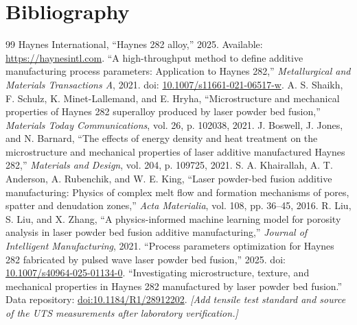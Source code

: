 \documentclass[12pt,a4paper,oneside]{report}
\begin{document}
\chapter{Bibliography}
\begin{thebibliography}{99}
 Haynes International, ``Haynes 282 alloy,'' 2025. Available: \url{https://haynesintl.com}.
 ``A high-throughput method to define additive manufacturing process parameters: Application to Haynes 282,'' \emph{Metallurgical and Materials Transactions A}, 2021. doi: \href{https://doi.org/10.1007/s11661-021-06517-w}{10.1007/s11661-021-06517-w}.
 A. S. Shaikh, F. Schulz, K. Minet-Lallemand, and E. Hryha, ``Microstructure and mechanical properties of Haynes 282 superalloy produced by laser powder bed fusion,'' \emph{Materials Today Communications}, vol. 26, p. 102038, 2021.
 J. Boswell, J. Jones, and N. Barnard, ``The effects of energy density and heat treatment on the microstructure and mechanical properties of laser additive manufactured Haynes 282,'' \emph{Materials and Design}, vol. 204, p. 109725, 2021.
 S. A. Khairallah, A. T. Anderson, A. Rubenchik, and W. E. King, ``Laser powder-bed fusion additive manufacturing: Physics of complex melt flow and formation mechanisms of pores, spatter and denudation zones,'' \emph{Acta Materialia}, vol. 108, pp. 36--45, 2016.
 R. Liu, S. Liu, and X. Zhang, ``A physics-informed machine learning model for porosity analysis in laser powder bed fusion additive manufacturing,'' \emph{Journal of Intelligent Manufacturing}, 2021.
 ``Process parameters optimization for Haynes 282 fabricated by pulsed wave laser powder bed fusion,'' 2025. doi: \href{https://doi.org/10.1007/s40964-025-01134-0}{10.1007/s40964-025-01134-0}.
 ``Investigating microstructure, texture, and mechanical properties in Haynes 282 manufactured by laser powder bed fusion.'' Data repository: \href{https://doi.org/10.1184/R1/28912202}{doi:10.1184/R1/28912202}.
 \textit{[Add tensile test standard and source of the UTS measurements after laboratory verification.]}
\end{thebibliography}
\end{document}
